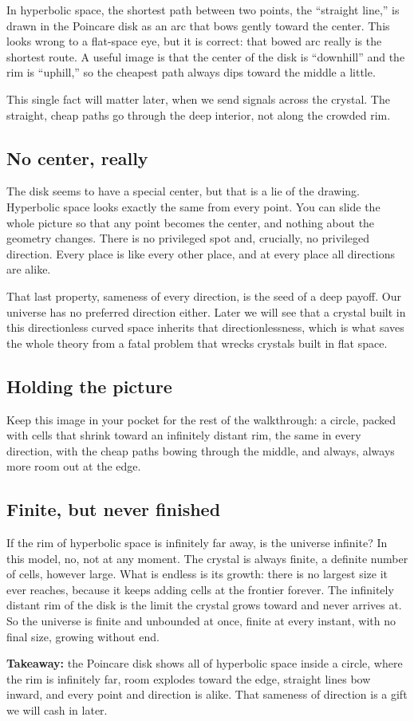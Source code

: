 In hyperbolic space, the shortest path between two points, the ``straight line,'' is drawn in the Poincare disk as an arc that bows gently toward the center. This looks wrong to a flat-space eye, but it is correct: that bowed arc really is the shortest route. A useful image is that the center of the disk is ``downhill'' and the rim is ``uphill,'' so the cheapest path always dips toward the middle a little.

This single fact will matter later, when we send signals across the crystal. The straight, cheap paths go through the deep interior, not along the crowded rim.

\subsection{No center, really}

The disk seems to have a special center, but that is a lie of the drawing. Hyperbolic space looks exactly the same from every point. You can slide the whole picture so that any point becomes the center, and nothing about the geometry changes. There is no privileged spot and, crucially, no privileged direction. Every place is like every other place, and at every place all directions are alike.

That last property, sameness of every direction, is the seed of a deep payoff. Our universe has no preferred direction either. Later we will see that a crystal built in this directionless curved space inherits that directionlessness, which is what saves the whole theory from a fatal problem that wrecks crystals built in flat space.

\subsection{Holding the picture}

Keep this image in your pocket for the rest of the walkthrough: a circle, packed with cells that shrink toward an infinitely distant rim, the same in every direction, with the cheap paths bowing through the middle, and always, always more room out at the edge.

\subsection{Finite, but never finished}

If the rim of hyperbolic space is infinitely far away, is the universe infinite? In this model, no, not at any moment. The crystal is always finite, a definite number of cells, however large. What is endless is its growth: there is no largest size it ever reaches, because it keeps adding cells at the frontier forever. The infinitely distant rim of the disk is the limit the crystal grows toward and never arrives at. So the universe is finite and unbounded at once, finite at every instant, with no final size, growing without end.

\textbf{Takeaway:} the Poincare disk shows all of hyperbolic space inside a circle, where the rim is infinitely far, room explodes toward the edge, straight lines bow inward, and every point and direction is alike. That sameness of direction is a gift we will cash in later.
